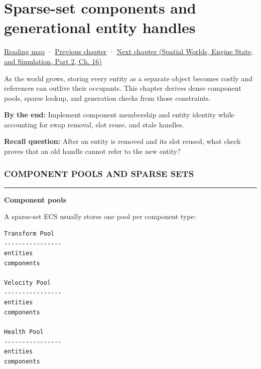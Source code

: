 \chapter{Sparse-set components and generational entity handles}\label{05-engine-i-ch015-sparse-set-components-and-generational-entity-handles}\hypertarget{05-engine-i-ch015}{}\label{stagechapter:05-engine-i-ch015}

\hypertarget{05-engine-i-ch015-sparse-set-components-and-generational-entity-handles}{}

\hyperref[volume-reading-map]{Reading map} · \hyperref[05-engine-i-ch014-application-clocks-and-stable-input-identity]{Previous chapter} · \href{../05-Spatial-Worlds-Engine-State-and-Simulation-P02/main.pdf\#nameddest=05-engine-i-ch016-archetypes-chunks-relationships-and-transforms}{Next chapter (Spatial Worlds, Engine State, and Simulation, Part 2, Ch. 16)}

As the world grows, storing every entity as a separate object becomes costly and references can outlive their occupants. This chapter derives dense component pools, sparse lookup, and generation checks from those constraints.

\textbf{By the end:} Implement component membership and entity identity while accounting for swap removal, slot reuse, and stale handles.

\textbf{Recall question:} After an entity is removed and its slot reused, what check proves that an old handle cannot refer to the new entity?

\subsection{COMPONENT POOLS AND SPARSE SETS}\label{05-engine-i-ch015-component-pools-and-sparse-sets}

\hypertarget{05-engine-i-ch015-component-pools-and-sparse-sets}{}

\begin{center}\rule{0.5\linewidth}{0.5pt}\end{center}

\textbf{Component pools}

A sparse-set ECS usually stores one pool per component type:

\begin{verbatim}
Transform Pool
----------------
entities
components

Velocity Pool
----------------
entities
components

Health Pool
----------------
entities
components
\end{verbatim}

